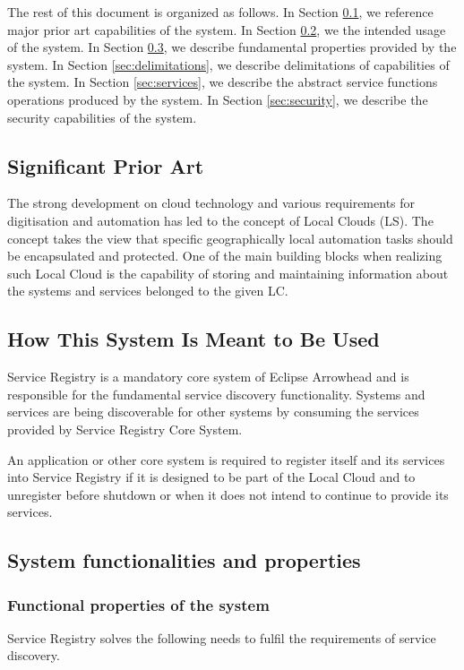 \documentclass[a4paper]{arrowhead}
\begin{document}
The rest of this document is organized as follows.
In Section \ref{sec:prior_art}, we reference major prior art capabilities
of the system.
In Section \ref{sec:use}, we the intended usage of the system.
In Section \ref{sec:properties}, we describe fundamental properties
provided by the system.
In Section \ref{sec:delimitations}, we describe delimitations of capabilities
of the system.
In Section \ref{sec:services}, we describe the abstract service
functions operations produced by the system.
In Section \ref{sec:security}, we describe the security capabilities
of the system.

\newpage

\subsection{Significant Prior Art}
\label{sec:prior_art}

The strong development on cloud technology and various requirements for digitisation and automation has led to the concept of Local Clouds (LS). The concept takes the view that specific geographically local automation tasks should be encapsulated and protected. One of the main building blocks when realizing such Local Cloud is the capability of storing and maintaining information about the systems and services belonged to the given LC.

\subsection{How This System Is Meant to Be Used}
\label{sec:use}

Service Registry is a mandatory core system of Eclipse Arrowhead and is responsible for the fundamental service discovery functionality. Systems and services are being discoverable for other systems by consuming the services provided by Service Registry Core System.

An application or other core system is required to register itself and its services into Service Registry if it is designed to be part of the Local Cloud and to unregister before shutdown or when it does not intend to continue to provide its services.

\subsection{System functionalities and properties}
\label{sec:properties}

\subsubsection {Functional properties of the system}
Service Registry solves the following needs to fulfil the requirements of service discovery.
\end{document}

